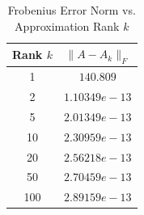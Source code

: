 \begin{table}[htbp]
\centering
\begin{tabular}{cc}
\toprule
Rank $k$ & $\|A - A_k\|_F$ \\
\midrule
1 & $140.809$ \\
2 & $1.10349e-13$ \\
5 & $2.01349e-13$ \\
10 & $2.30959e-13$ \\
20 & $2.56218e-13$ \\
50 & $2.70459e-13$ \\
100 & $2.89159e-13$ \\
\bottomrule
\end{tabular}
\caption{Frobenius Error Norm vs. Approximation Rank $k$}
\label{tab:error_k}
\end{table}
